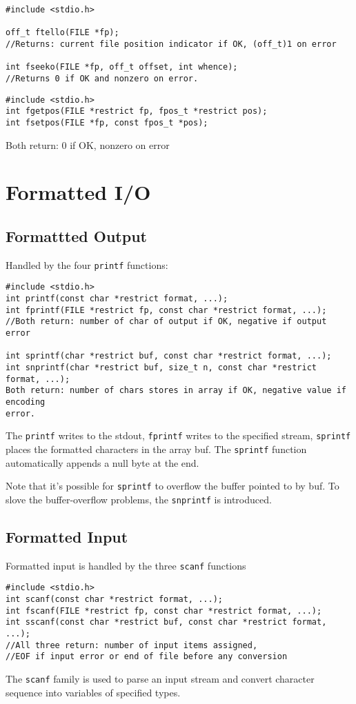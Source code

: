\documentclass[a4paper,10pt]{book}
\begin{document}
\begin{verbatim}
#include <stdio.h>

off_t ftello(FILE *fp); 
//Returns: current file position indicator if OK, (off_t)1 on error

int fseeko(FILE *fp, off_t offset, int whence); 
//Returns 0 if OK and nonzero on error.
\end{verbatim}

\begin{verbatim}
#include <stdio.h>
int fgetpos(FILE *restrict fp, fpos_t *restrict pos);
int fsetpos(FILE *fp, const fpos_t *pos);
\end{verbatim}
Both return: 0 if OK, nonzero on error
\section{Formatted I/O}
\subsection{Formattted Output}
Handled by the four \verb|printf| functions:
\begin{verbatim}
#include <stdio.h>
int printf(const char *restrict format, ...);
int fprintf(FILE *restrict fp, const char *restrict format, ...);
//Both return: number of char of output if OK, negative if output error

int sprintf(char *restrict buf, const char *restrict format, ...);
int snprintf(char *restrict buf, size_t n, const char *restrict format, ...);
Both return: number of chars stores in array if OK, negative value if encoding
error.
\end{verbatim}
The \verb|printf| writes to the stdout, \verb|fprintf| writes to the specified
stream, \verb|sprintf| places the formatted characters in the array buf. The
\verb|sprintf| function automatically appends a null byte at the end.

Note that it's possible for \verb|sprintf| to overflow the buffer pointed to by
buf. To slove the buffer-overflow problems, the \verb|snprintf| is introduced.

\subsection{Formatted Input}
Formatted input is handled by the three \verb|scanf| functions
\begin{verbatim}
#include <stdio.h>
int scanf(const char *restrict format, ...);
int fscanf(FILE *restrict fp, const char *restrict format, ...);
int sscanf(const char *restrict buf, const char *restrict format, ...);
//All three return: number of input items assigned, 
//EOF if input error or end of file before any conversion
\end{verbatim}
The \verb|scanf| family is used to parse an input stream and convert character
sequence into variables of specified types.
\end{document}
